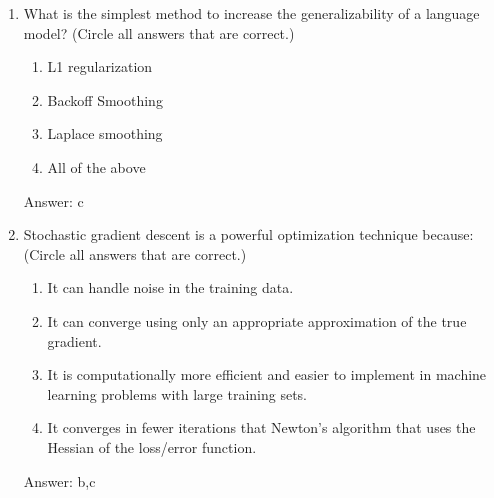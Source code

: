 \documentclass[11pt]{report}
\begin{document}
\begin{enumerate}
\item
What is the simplest method to increase the generalizability of a language model? (Circle all answers that are correct.)
\begin{enumerate}
\item  L1 regularization
\item  Backoff Smoothing
\item  Laplace smoothing
\item  All of the above
\end{enumerate}
\begin{mdframed}
Answer: c
\end{mdframed}
\item
Stochastic gradient descent is a powerful optimization technique because: (Circle all answers that are correct.)
\begin{enumerate}
\item  It can handle noise in the training data.
\item  It can converge using only an appropriate approximation of the true gradient.
\item It is computationally more efficient and easier to implement in machine learning problems with large training sets.
\item  It converges in fewer iterations that Newton's algorithm that uses the Hessian of the loss/error function.
\end{enumerate}
\begin{mdframed}
Answer: b,c
\end{mdframed}


\end{enumerate}
\end{document}
